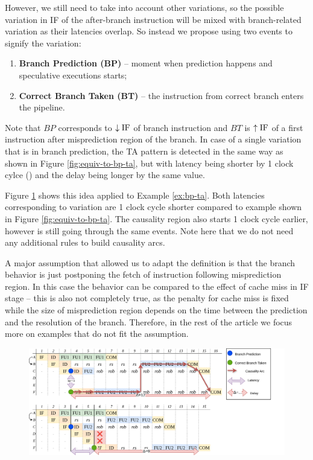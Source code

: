 However, we still need to take into account other variations, so the possible variation in IF of the after-branch instruction will be mixed with branch-related variation as their latencies overlap. So instead we propose using two events to signify the variation:

\begin{enumerate}
    \item \textbf{Branch Prediction (BP)} -- moment when prediction happens and speculative executions starts;
    \item \textbf{Correct Branch Taken (BT)} -- the instruction from correct branch enters the pipeline.
\end{enumerate}

Note that $BP$ corresponds to $\downarrow\mathrm{IF}$ of branch instruction and $BT$ is $\uparrow\mathrm{IF}$ of a first instruction after misprediction region of the branch. In case of a single variation that is in branch prediction, the TA pattern is detected in the same way as shown in Figure \ref{fig:equiv-to-bp-ta}, but with latency being shorter by 1 clock cylce () and the delay being longer by the same value.

Figure \ref{fig:bp-ta-analysed} shows this idea applied to Example \ref{ex:bp-ta}. Both latencies corresponding to variation are 1 clock cycle shorter compared to example shown in Figure \ref{fig:equiv-to-bp-ta}. The causality region also starts 1 clock cycle earlier, however is still going through the same events. Note here that we do not need any additional rules to build causality arcs.

A major assumption that allowed us to adapt the definition is that the branch behavior is just postponing the fetch of instruction following misprediction region. In this case the behavior can be compared to the effect of cache miss in IF stage -- this is also not completely true, as the penalty for cache miss is fixed while the size of misprediction region depends on the time between the prediction and the resolution of the branch. Therefore, in the rest of the article we focus more on examples that do not fit the assumption.



\begin{figure}[H]
    \centering
    \includegraphics[width=\textwidth]{figures/simple-branch-ta-analysed.png}
    \caption{\TODO{}}
    \label{fig:bp-ta-analysed}
\end{figure}

